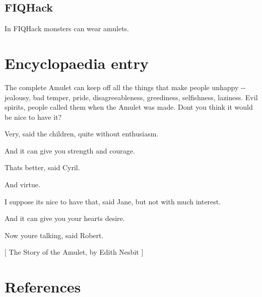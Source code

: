 \subsection{FIQHack}
\label{8}
In FIQHack\footnotemark[91] monsters can wear amulets.



\section{Encyclopaedia entry}
\label{9}

The complete Amulet can keep off all the things that make people unhappy -{}-{} jealousy, bad temper, pride, disagreeableness, greediness, selfishness, laziness.  Evil spirits, people called them when the Amulet was made.  Don\textquotesingle{}t you think it would be nice to have it?$\text{ }$\newline{}

Very, said the children, quite without enthusiasm.$\text{ }$\newline{}

And it can give you strength and courage.$\text{ }$\newline{}

That\textquotesingle{}s better, said Cyril.$\text{ }$\newline{}

And virtue.$\text{ }$\newline{}

I suppose it\textquotesingle{}s nice to have that, said Jane, but not with much interest.$\text{ }$\newline{}

And it can give you your heart\textquotesingle{}s desire.$\text{ }$\newline{}

Now you\textquotesingle{}re talking, said Robert.$\text{ }$\newline{}




{$\text{[}$} The Story of the Amulet, by Edith Nesbit {$\text{]}$} 

\section{References}
\label{10}

